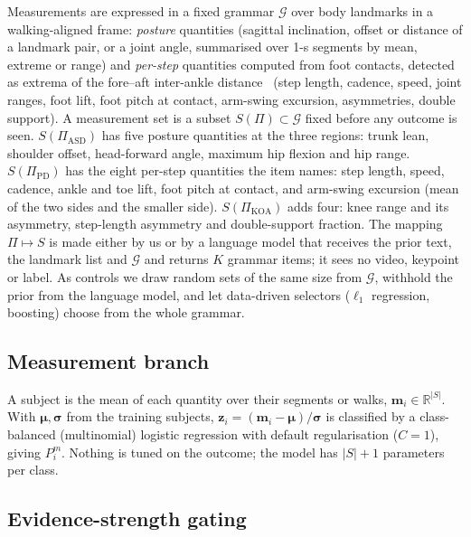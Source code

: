 \documentclass[runningheads]{llncs}
\begin{document}
Measurements are expressed in a fixed grammar $\mathcal{G}$ over body landmarks in a
walking-aligned frame: \emph{posture} quantities (sagittal inclination, offset or distance
of a landmark pair, or a joint angle, summarised over 1-s segments by mean, extreme or
range) and \emph{per-step} quantities computed from foot contacts, detected as extrema of
the fore--aft inter-ankle distance~\cite{zeni2008gait} (step length, cadence, speed, joint
ranges, foot lift, foot pitch at contact, arm-swing excursion, asymmetries, double support).
A measurement set is a subset $S(\Pi)\subset\mathcal{G}$ fixed before any outcome is seen.
$S(\Pi_{\mathrm{ASD}})$ has five posture quantities at the three regions: trunk lean,
shoulder offset, head-forward angle, maximum hip flexion and hip range.
$S(\Pi_{\mathrm{PD}})$ has the eight per-step quantities the item names: step length,
speed, cadence, ankle and toe lift, foot pitch at contact, and arm-swing excursion (mean of
the two sides and the smaller side). $S(\Pi_{\mathrm{KOA}})$ adds four: knee range and its
asymmetry, step-length asymmetry and double-support fraction. The mapping $\Pi\mapsto S$ is made either by us or by a language model that receives the
prior text, the landmark list and $\mathcal{G}$ and returns $K$ grammar items; it sees no
video, keypoint or label. As controls we draw random sets of the same size from
$\mathcal{G}$, withhold the prior from the language model, and let data-driven selectors
($\ell_1$ regression, boosting) choose from the whole grammar.

\subsection{Measurement branch}

A subject is the mean of each quantity over their segments or walks,
$\mathbf{m}_i\in\mathbb{R}^{|S|}$. With $\boldsymbol\mu,\boldsymbol\sigma$ from the training
subjects, $\mathbf{z}_i=(\mathbf{m}_i-\boldsymbol\mu)/\boldsymbol\sigma$ is classified by a
class-balanced (multinomial) logistic regression with default regularisation ($C{=}1$),
giving $P^{m}_i$. Nothing is tuned on the outcome; the model has $|S|{+}1$ parameters per
class.

\subsection{Evidence-strength gating}
\label{sec:gate}
\end{document}
